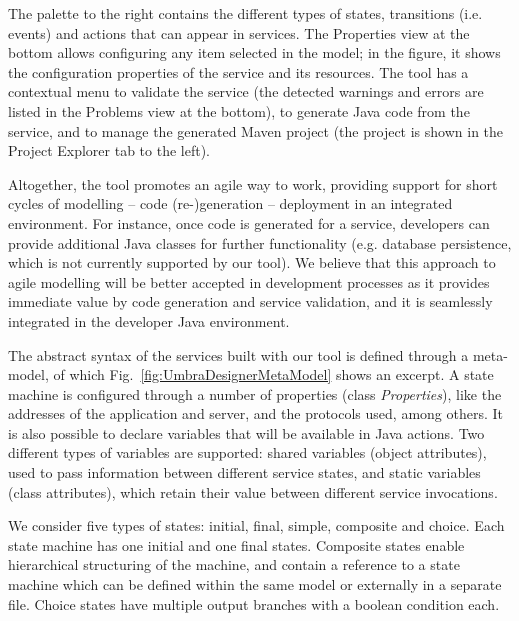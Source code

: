 The palette to the right contains the different types of states, transitions (i.e. events) and actions that can
appear in services. The Properties view at the bottom allows configuring any item selected in the model; in the
figure, it shows the configuration properties of the service and its resources. The tool has a contextual menu 
to validate the service (the detected warnings and errors are listed in the Problems view at the bottom), to 
generate Java code from the service, and to manage the generated Maven project (the project is shown in the 
Project Explorer tab to the left). 

Altogether, the tool promotes an agile way to work, providing support for short cycles of modelling -- 
code (re-)generation -- deployment in an integrated environment. For instance, once code is generated
for a service, developers can provide additional Java classes for further functionality 
(e.g. database persistence, which is not currently supported by our tool). We believe that this approach to 
agile modelling will be better accepted in development processes as it provides immediate value by code 
generation and service validation, and it is seamlessly integrated in the developer Java environment.

The abstract syntax of the services built with our tool is defined through a meta-model, of which
Fig.~\ref{fig:UmbraDesignerMetaModel} shows an excerpt. A state machine is configured through a 
number of properties (class {\em Properties}), like the addresses of the application and server, and 
the protocols used, among others. It is also possible to declare variables that will be available in
Java actions. Two different types of variables are supported: shared variables (object attributes), 
used to pass information between different service states, and static variables (class attributes), 
which retain their value between different service invocations. 


We consider five types of states: initial, final, simple, composite and choice. Each state machine has 
one initial and one final states. Composite states enable hierarchical structuring of the machine, and 
contain a reference to a state machine which can be defined within the same model or externally in a 
separate file. Choice states have multiple output branches with a boolean condition each.


